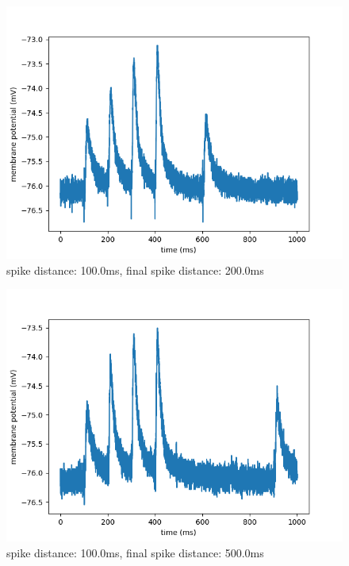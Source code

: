 \documentclass[10pt,a4paper]{scrartcl}
\begin{document}
\newpage

\begin{figure} [ht]
\begin{center}
\label{fig:abb15}
\caption{spike distance: 100.0ms, final spike distance: 200.0ms}
\includegraphics[scale=0.35]{pictures/final_spike_variation_5.pdf} 
\end{center}
\end{figure}


\begin{figure} [ht]
\begin{center}
\label{fig:abb16}
\caption{spike distance: 100.0ms, final spike distance: 500.0ms}
\includegraphics[scale=0.35]{pictures/final_spike_variation_6.pdf} 
\end{center}
\end{figure}
\end{document}
